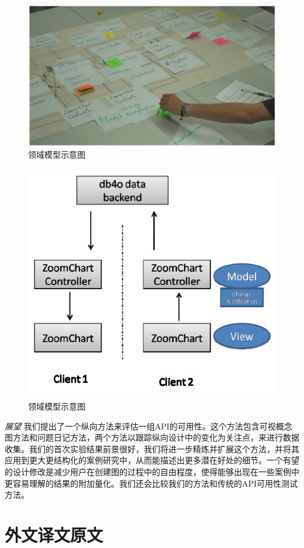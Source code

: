 \begin{figure}[!hbp]
  \begin{center}
    \includegraphics[scale=0.3]{figures/translation/translation_api_fig5.png}
    领域模型示意图
  \end{center}
\end{figure}

\begin{figure}[!hbp]
  \begin{center}
    \includegraphics[scale=0.3]{figures/translation/translation_api_fig6.png}
    领域模型示意图
  \end{center}
\end{figure}

\textit{展望}
我们提出了一个纵向方法来评估一组API的可用性。这个方法包含可视概念图方法和问题日记方法，两个方法以跟踪纵向设计中的变化为关注点，来进行数据收集。我们的首次实验结果前景很好，我们将进一步精炼并扩展这个方法，并将其应用到更大更结构化的案例研究中，从而能描述出更多潜在好处的细节。一个有望的设计修改是减少用户在创建图的过程中的自由程度，使得能够出现在一些案例中更容易理解的结果的附加量化。我们还会比较我们的方法和传统的API可用性测试方法。

\section*{外文译文原文}
